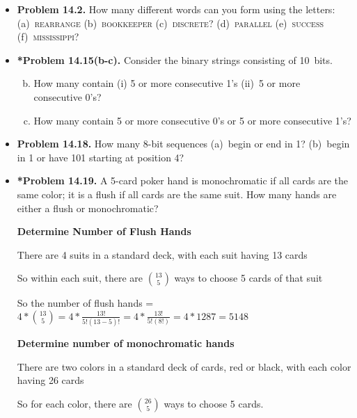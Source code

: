 \documentclass[11pt]{article}
\begin{document}
\begin{itemize}
\vspace{0.2in}

\item \textbf{Problem 14.2.}
How many different words can you form using the letters:
(a)~\textsc{rearrange} (b)~\textsc{bookkeeper} (c)~\textsc{discrete}?
(d)~\textsc{parallel} (e)~\textsc{success} (f)~\textsc{mississippi}?

\vspace{0.2in}

\item \textbf{*Problem 14.15(b-c).}  %
Consider the binary strings consisting of 10~bits.

\begin{enumerate}[(a)]
\setcounter{enumi}{1}
\item How many contain (i) 5 or more consecutive 1's (ii)~5 or more consecutive 0's?
\item How many contain 5 or more consecutive 0's or 5 or more consecutive 1's?
\end{enumerate}

\vspace{0.2in}

\item \textbf{Problem 14.18.}
How many 8-bit sequences
(a)~begin or end in 1?
(b)~begin in 1 or have 101 starting at position 4?

\vspace{0.2in}

\item \textbf{*Problem 14.19.}
A 5-card poker hand is monochromatic if all cards are the same color;
it is a flush if all cards are the same suit.
How many hands are either a flush or monochromatic?

\textbf{Determine Number of Flush Hands}

There are 4 suits in a standard deck, with each suit having 13 cards

So within each suit, there are $\binom{13}{5}$ ways to choose 5 cards of that suit

So the number of flush hands = $4 * \binom{13}{5} = 4 * \frac{13!}{5!(13-5)!} = 4 * \frac{13!}{5!(8!)} = 4 * 1287 = \boxed{5148}$ 

\vspace*{0.1in}

\textbf{Determine number of monochromatic hands}

There are two colors in a standard deck of cards, red or black, with each color having 26 cards

So for each color, there are $\binom{26}{5}$ ways to choose 5 cards.


\end{itemize}
\end{document}
